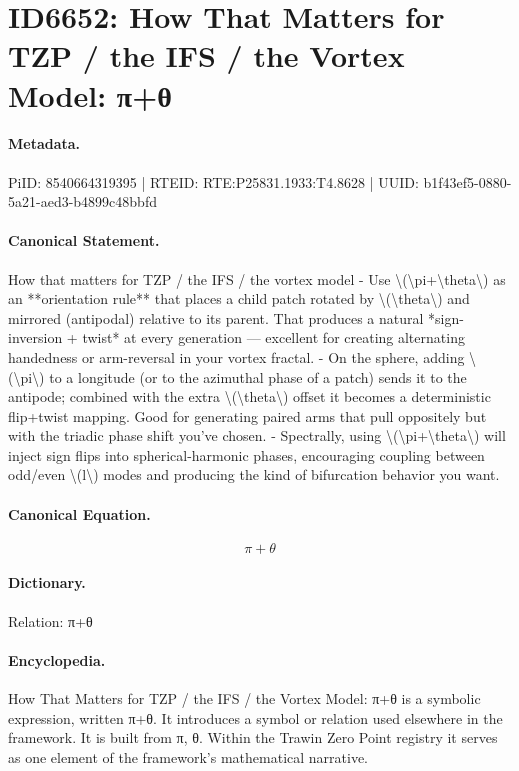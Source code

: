 \section*{ID6652: How That Matters for TZP / the IFS / the Vortex Model: π+θ}
\paragraph{Metadata.}
PiID: 8540664319395 | RTEID: RTE:P25831.1933:T4.8628 | UUID: b1f43ef5-0880-5a21-aed3-b4899c48bbfd

\paragraph{Canonical Statement.}
How that matters for TZP / the IFS / the vortex model - Use \textbackslash{}(\textbackslash{}pi+\textbackslash{}theta\textbackslash{}) as an **orientation rule** that places a child patch rotated by \textbackslash{}(\textbackslash{}theta\textbackslash{}) and mirrored (antipodal) relative to its parent. That produces a natural *sign-inversion + twist* at every generation — excellent for creating alternating handedness or arm-reversal in your vortex fractal. - On the sphere, adding \textbackslash{}(\textbackslash{}pi\textbackslash{}) to a longitude (or to the azimuthal phase of a patch) sends it to the antipode; combined with the extra \textbackslash{}(\textbackslash{}theta\textbackslash{}) offset it becomes a deterministic flip+twist mapping. Good for generating paired arms that pull oppositely but with the triadic phase shift you’ve chosen. - Spectrally, using \textbackslash{}(\textbackslash{}pi+\textbackslash{}theta\textbackslash{}) will inject sign flips into spherical-harmonic phases, encouraging coupling between odd/even \textbackslash{}(l\textbackslash{}) modes and producing the kind of bifurcation behavior you want.

\paragraph{Canonical Equation.}
\[
\pi+\theta
\]

\paragraph{Dictionary.}
Relation: π+θ

\paragraph{Encyclopedia.}
How That Matters for TZP / the IFS / the Vortex Model: π+θ is a symbolic expression, written π+θ. It introduces a symbol or relation used elsewhere in the framework. It is built from π, θ. Within the Trawin Zero Point registry it serves as one element of the framework's mathematical narrative.
